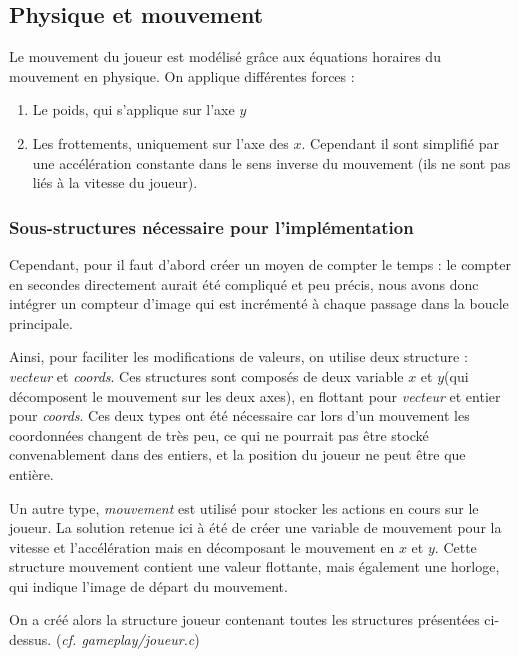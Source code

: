 \documentclass[12pt]{article}
\begin{document}
		\newpage
		
	
		\subsection{Physique et mouvement}
		
		Le mouvement du joueur est modélisé grâce aux équations horaires du mouvement en physique. On applique différentes forces : 
		\begin{enumerate}
			\item Le poids, qui s'applique sur l'axe \(y\)
			\item Les frottements, uniquement sur l'axe des \(x\). Cependant il sont simplifié par une accélération constante dans le sens inverse du mouvement (ils ne sont pas liés à la vitesse du joueur).
		\end{enumerate}
		
		\subsubsection{Sous-structures nécessaire pour l'implémentation}
		
		Cependant, pour il faut d'abord créer un moyen de compter le temps : le compter en secondes directement aurait été compliqué et peu précis, nous avons donc intégrer un compteur d'image qui est incrémenté à chaque passage dans la boucle principale.
		
		\medskip
		
		Ainsi, pour faciliter les modifications de valeurs, on utilise deux structure : \textit{vecteur} et \textit{coords}.
		Ces structures sont composés de deux variable \(x\) et \(y\)(qui décomposent le mouvement sur les deux axes), en flottant pour \textit{vecteur} et entier pour \textit{coords}. Ces deux types ont été nécessaire car lors d'un mouvement les coordonnées changent de très peu, ce qui ne pourrait pas être stocké convenablement dans des entiers, et la position du joueur ne peut être que entière.  
		
		Un autre type, \textit{mouvement} est utilisé pour stocker les actions en cours sur le joueur. La solution retenue ici à été de créer une variable de mouvement pour la vitesse et l'accélération mais en décomposant le mouvement en \(x\) et \(y\). Cette structure mouvement contient une valeur flottante, mais également une horloge, qui indique l'image de départ du mouvement.
		 
		\medskip
		On a créé alors la structure joueur contenant toutes les structures présentées ci-dessus. (\textit{cf. gameplay/joueur.c})
		
\end{document}

